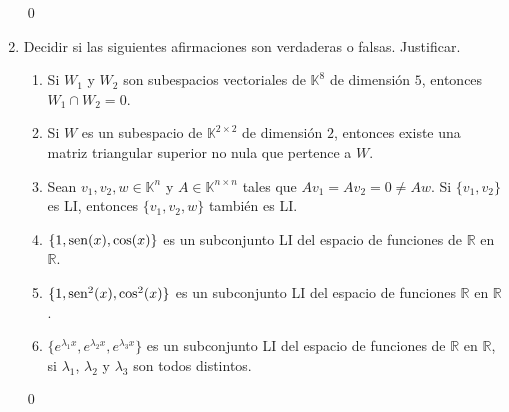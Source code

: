 \begin{enumerate}[resume, topsep=6pt, itemsep=.4cm]
    
    \rta 

    \qed     
        
    \item\label{verdadero o falso} Decidir si las siguientes afirmaciones son verdaderas o falsas. Justificar.
    
    \begin{enumerate}
    \item Si $W_1$ y $W_2$ son subespacios vectoriales de $\mathbb{K}^8$ de dimensión $5$, entonces $W_1\cap W_2=0$.
    \item Si $W$ es un subespacio de $\mathbb{K}^{2\times2}$ de dimensión $2$, entonces existe una matriz triangular superior no nula que pertence a $W$.
    \item Sean $v_1, v_2, w\in \mathbb{K}^{n}$ y $A\in\mathbb{K}^{n\times n}$ tales que $Av_1=Av_2=0\neq Aw$. Si $\{v_1, v_2\}$ es LI, entonces $\{v_1,v_2,w\}$ también es LI.
    \item\label{cos}  $\{1,{\rm sen}(x),\cos(x)\}$ es un subconjunto LI del espacio de funciones de $\mathbb{R}$ en $\mathbb{R}$.
    \item\label{cos2}  $\{1,{\rm sen}^2(x),\cos^2(x)\}$ es un subconjunto LI del espacio de funciones $\mathbb{R}$ en $\mathbb{R}$.
    \item\label{exponencial}  $\{e^{\lambda_1x},e^{\lambda_2x},e^{\lambda_3x}\}$ es un subconjunto LI del espacio de funciones de
    $\mathbb{R}$ en $\mathbb{R}$, si $\lambda_1$, $\lambda_2$ y $\lambda_3$ son todos distintos.
    \end{enumerate}
    
    
    \rta 

    \qed     
    
    
    
    
    \end{enumerate}
    
    